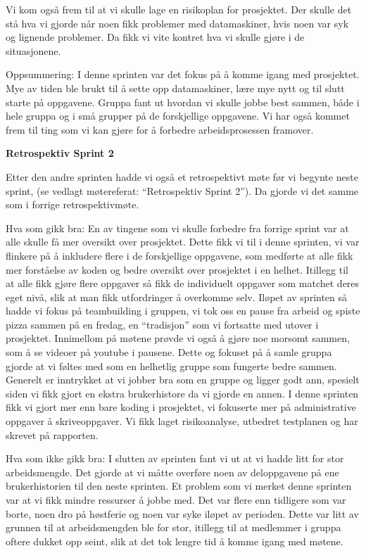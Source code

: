 \documentclass[12pt,a4paper,norsk]{article}
\begin{document}
Vi kom også frem til at vi skulle lage en risikoplan for prosjektet. Der skulle det stå hva vi gjorde når noen fikk problemer med datamaskiner, hvis noen var syk og lignende problemer. Da fikk vi vite kontret hva vi skulle gjøre i de situasjonene. 

Oppsummering:
I denne sprinten var det fokus på å komme igang med prosjektet. Mye av tiden ble brukt til å sette opp datamaskiner, lære mye nytt og til slutt starte på oppgavene. Gruppa fant ut hvordan vi skulle jobbe best sammen, både i hele gruppa og i små grupper på de forskjellige oppgavene. Vi har også kommet frem til ting som vi kan gjøre for å forbedre arbeidsprosessen framover. 

\bigskip \noindent \textbf{Retrospektiv Sprint 2}
\par Etter den andre sprinten hadde vi også et retrospektivt møte før vi begynte neste sprint, (se vedlagt møtereferat: “Retrospektiv Sprint 2”). Da gjorde vi det samme som i forrige retrospektivmøte.

Hva som gikk bra:
En av tingene som vi skulle forbedre fra forrige sprint var at alle skulle få mer oversikt over prosjektet. Dette fikk vi til i denne sprinten, vi var flinkere på å inkludere flere i de forskjellige oppgavene, som medførte at alle fikk mer forståelse av koden og bedre oversikt over prosjektet i en helhet. Itillegg til at alle fikk gjøre flere oppgaver så fikk de individuelt oppgaver som matchet deres eget nivå, slik at man fikk utfordringer å overkomme selv.
Iløpet av sprinten så hadde vi fokus på teambuilding i gruppen, vi tok oss en pause fra arbeid og spiste pizza sammen på en fredag, en “tradisjon” som vi fortsatte med utover i prosjektet. Innimellom på møtene prøvde vi også å gjøre noe morsomt sammen, som å se videoer på youtube i pausene. Dette og fokuset på å samle gruppa gjorde at vi føltes med som en helhetlig gruppe som fungerte bedre sammen. 
Generelt er inntrykket at vi jobber bra som en gruppe og ligger godt ann, spesielt siden vi fikk gjort en ekstra brukerhistore da vi gjorde en annen. 
I denne sprinten fikk vi gjort mer enn bare koding i prosjektet, vi fokuserte mer på administrative oppgaver å skriveoppgaver. Vi fikk laget risikoanalyse, utbedret testplanen og har skrevet på rapporten. 

Hva som ikke gikk bra:
I slutten av sprinten fant vi ut at vi hadde litt for stor arbeidsmengde. Det gjorde at vi måtte overføre noen av deloppgavene på ene brukerhistorien til den neste sprinten. 
Et problem som vi merket denne sprinten var at vi fikk mindre ressurser å jobbe med. Det var flere enn tidligere som var borte, noen dro på høstferie og noen var syke iløpet av perioden. Dette var litt av grunnen til at arbeidsmengden ble for stor, itillegg til at medlemmer i gruppa oftere dukket opp seint, slik at det tok lengre tid å komme igang med møtene. 
\end{document}
